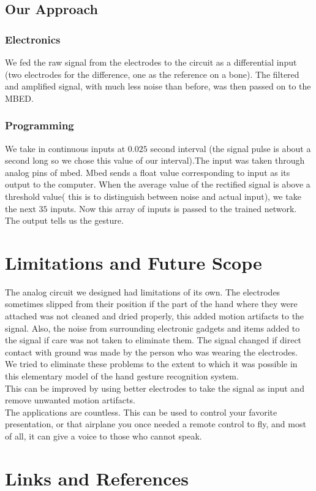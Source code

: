 \documentclass{article}
\begin{document}
\subsection{Our Approach}
\subsubsection{Electronics}
We fed the raw signal from the electrodes to the circuit as a differential input (two electrodes for the difference, one as the reference on a bone). The filtered and amplified signal, with much less noise than before, was then passed on to the MBED.
\subsubsection{Programming}
We take in continuous inputs at $0.025$ second interval (the signal pulse is about a second long so we chose this value of our interval).The input was taken through analog pins of mbed. Mbed sends a float value corresponding to input as its output to the computer. When the average value of the rectified signal is above a threshold value( this is to distinguish between noise and actual input), we take the next $35$ inputs. Now this array of inputs is passed to the trained network. The output tells us the gesture.
\section{Limitations and Future Scope}
The analog circuit we designed had limitations of its own. The electrodes sometimes slipped from their position if the part of the hand where they were attached was not cleaned and dried properly, this added motion artifacts to the signal. 
Also, the noise from surrounding electronic gadgets and items added to the signal if care was not taken to eliminate them. 
The signal changed if direct contact with ground was made by the person who was wearing the electrodes.
\\
We tried to eliminate these problems to the extent to which it was possible in this elementary model of the hand gesture recognition system.
\\
This can be improved by using better electrodes to take the signal as input and remove unwanted motion artifacts. 
\\
The applications are countless. This can be used to control your favorite presentation, or that airplane you once needed a remote control to fly, and most of all, it can give a voice to those who cannot speak.
\section{Links and References}
\end{document}
